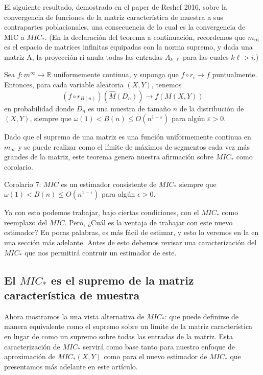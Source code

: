 	El siguiente resultado, demostrado en el paper de Reshef 2016, sobre la convergencia de funciones de la matriz caracter\'istica de muestra a sus contrapartes poblacionales, una consecuencia de lo cual es la convergencia de MIC a $MIC_*$. (En la declaraci\'on del teorema a continuaci\'on, recordemos que $m_\infty$ es el espacio de matrices infinitas equipadas con la norma supremo, y dada una matriz A, la proyecci\'on ri anula todas las entradas $A_{k, \ell}$ para las cuales $k\ell > i.$)

	\begin{thm}
		Sea $f: m^{\infty} \rightarrow \mathbb{R}$ uniformemente continua, y suponga que $f \circ r_i \rightarrow f$ puntualmente. Entonces, para cada variable aleatoria $(X, Y)$, tenemos
		$$
		\left(f \circ r_{B(n)}\right)\left(\widehat{M}\left(D_n\right)\right) \rightarrow f(M(X, Y))
		$$
		en probabilidad donde $D_n$ es una muestra de tama\~no $n$ de la distribuci\'on de $(X, Y)$, siempre que $\omega(1)<B(n) \leq O\left(n^{1-\varepsilon}\right)$ para alg\'un $\varepsilon>0$.
	\end{thm}

	Dado que el supremo de una matriz es una funci\'on uniformemente continua en $m_\infty$ y se puede realizar como el l\'imite de m\'aximos de segmentos cada vez m\'as grandes de la matriz, este teorema genera nuestra afirmaci\'on sobre $MIC_*$ como corolario.

	Corolario 7: $MIC$ es un estimador consistente de $MIC_*$ siempre que $\omega(1) < B(n) \leq O(n^{1-\epsilon})$ para alg\'un $\epsilon > 0$.

	Ya con esto podemos trabajar, bajo ciertas condiciones, con el $MIC_*$ como reemplazo del $MIC$. Pero, ¿Cu\'al es la ventaja de trabajar con este nuevo estimador? En pocas palabras, es m\'as f\'acil de estimar, y esto lo veremos en la en una secci\'on m\'as adelante. Antes de esto debemos revisar una caracterizaci\'on del $MIC_*$ que nos permitir\'a contruir un estimador de este.

	\subsection[short]{El $MIC_*$ es el supremo de la matriz caracter\'istica de muestra}

	Ahora mostramos la una vista alternativa de $MIC_*$: que puede definirse de manera equivalente como el supremo sobre un l\'imite de la matriz caracter\'istica en lugar de como un supremo sobre todas las entradas de la matriz. Esta caracterizaci\'on de $MIC_*$ servir\'a como base tanto para nuestro enfoque de aproximaci\'on de $MIC_*(X, Y)$ como para el nuevo estimador de $MIC_*$ que presentamos m\'as adelante en este art\'iculo.

